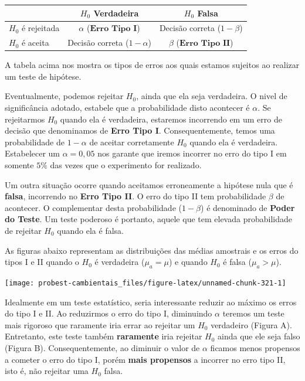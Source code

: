 \documentclass[
]{book}
\begin{document}
\begin{longtable}[]{@{}lcc@{}}
\toprule
& \(H_0\) Verdadeira & \(H_0\) Falsa \\
\midrule
\endhead
\(H_0\) é rejeitada & \(\alpha\) (\(\textbf{Erro Tipo I}\)) & Decisão correta (\(1-\beta\)) \\
\(H_0\) é aceita & Decisão correta (\(1-\alpha\)) & \(\beta\) (\(\textbf{Erro Tipo II}\)) \\
\bottomrule
\end{longtable}

A tabela acima nos mostra os tipos de erros aos quais estamos sujeitos ao realizar um teste de hipótese.

Eventualmente, podemos rejeitar \(H_0\), ainda que ela seja verdadeira. O nivel de significância adotado, estabele que a probabilidade disto acontecer é \(\alpha\). Se rejeitarmos \(H_0\) quando ela é verdadeira, estaremos incorrendo em um erro de decisão que denominamos de \textbf{Erro Tipo I}. Consequentemente, temos uma probabilidade de \(1 - \alpha\) de aceitar corretamente \(H_0\) quando ela é verdadeira. Estabelecer um \(\alpha = 0,05\) nos garante que iremos incorrer no erro do tipo I em somente \(5\%\) das vezes que o experimento for realizado.

Um outra situação ocorre quando aceitamos erroneamente a hipótese nula que é \textbf{falsa}, incorrendo no \textbf{Erro Tipo II}. O erro do tipo II tem probabilidade \(\beta\) de acontecer. O complementar desta probabilidade (\(1-\beta\)) é denominado de \textbf{Poder do Teste}. Um teste poderoso é portanto, aquele que tem elevada probabilidade de rejeitar \(H_0\) quando ela é falsa.

As figuras abaixo representam as distribuições das médias amostrais e os erros do tipos I e II quando o \(H_0\) é verdadeira (\(\mu_a = \mu\)) e quando \(H_0\) é falsa (\(\mu_a > \mu\)).

\begin{center}\texttt{[image: probest-cambientais\_files/figure-latex/unnamed-chunk-321-1]} \end{center}

Idealmente em um teste estatístico, seria interessante reduzir ao máximo os erros do tipo I e II. Ao reduzirmos o erro do tipo I, diminuindo \(\alpha\) teremos um teste mais rigoroso que raramente iria errar ao rejeitar um \(H_0\) verdadeiro (Figura A). Entretanto, este teste também \textbf{raramente} iria rejeitar \(H_0\) ainda que ele seja falso (Figura B). Consequentemente, ao diminuir o valor de \(\alpha\) ficamos menos propensos a cometer o erro do tipo I, porém \textbf{mais propensos} a incorrer no erro tipo II, isto é, não rejeitar uma \(H_0\) falsa.
\end{document}

